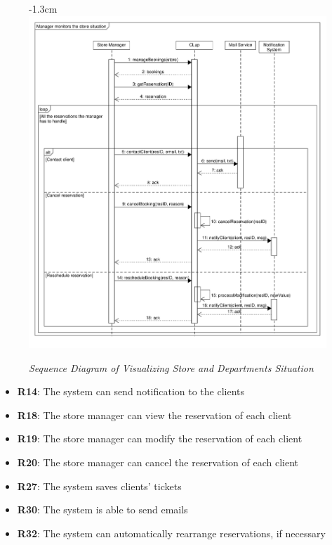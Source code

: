 \documentclass{article}
\begin{document}
\begin{center}
\begin{adjustwidth}{-3cm}{}
\begin{tabular}[h!]{|m{7.5em}|m{36em}|}
						\end{tabular}
					\end{adjustwidth}
				\newpage
					\begin{figure}[!h]
						\begin{adjustwidth} {-1.3cm}{}
							\centering
							\includegraphics[scale=0.42]{SD/9_manageReservations(store)}\\
							\caption{\emph{Sequence Diagram of Visualizing Store and Departments Situation}}
						\end{adjustwidth}
					\end{figure}
					\begin{itemize}
						\medskip
						
						{\bfseries Required functional requirements: }
						
						\item {\bfseries R14}: The system can send notiﬁcation to the clients
						\item {\bfseries R18}: The store manager can view the reservation of each client
						\item {\bfseries R19}: The store manager can modify the reservation of each client
						\item {\bfseries R20}: The store manager can cancel the reservation of each client
						\item {\bfseries R27}: The system saves clients' tickets
						\item {\bfseries R30}: The system is able to send emails
						\item{\bfseries R32}: The system can automatically rearrange reservations, if necessary
						

					\end{itemize}	
					
				\end{center}
			
\end{document}
